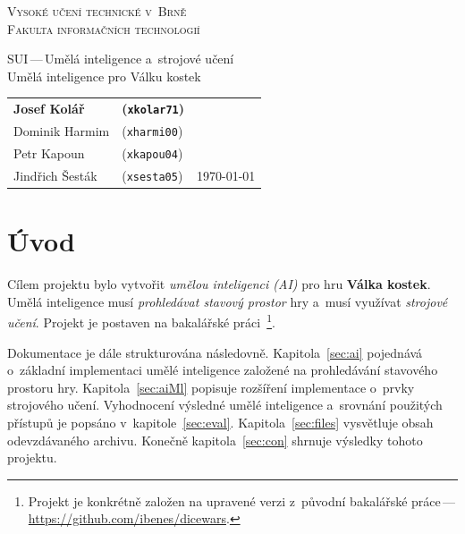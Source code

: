 \documentclass[11pt, a4paper]{article}
\theoremstyle{definition}
\begin{document}
\begin{titlepage}
    \begin{center}
        \LARGE{\textsc{Vysoké učení technické v~Brně}} \\
        \smallskip
        \Large{\textsc{Fakulta informačních technologií}} \\


        \LARGE{SUI\,---\,Umělá inteligence a~strojové učení} \\
        \smallskip
        \Huge{Umělá inteligence pro Válku kostek} \\

    \end{center}

    \Large{%
        \begin{tabular}{l l r}
            \textbf{Josef Kolář} & \textbf{(\texttt{xkolar71})} & \\
            Dominik Harmim & (\texttt{xharmi00}) & \\
            Petr Kapoun & (\texttt{xkapou04}) & \\
            Jindřich Šesták & (\texttt{xsesta05}) & \hspace{9em} \today
        \end{tabular}
    }
\end{titlepage}


\setcounter{page}{1}
\tableofcontents
\clearpage


\setcounter{page}{1}

\section{Úvod}

Cílem projektu bylo vytvořit \emph{umělou inteligenci (AI)} pro hru
\textbf{Válka kostek}. Umělá inteligence musí \emph{prohledávat stavový
prostor} hry a~musí využívat \emph{strojové učení}. Projekt je postaven
na bakalářské práci~\cite{turecekBP}\footnote{Projekt je konkrétně
založen na upravené verzi z~původní bakalářské
práce\,---\,\url{https://github.com/ibenes/dicewars}.}.

Dokumentace je dále strukturována následovně. Kapitola~\ref{sec:ai}
pojednává o~základní implementaci umělé inteligence založené na prohledávání
stavového prostoru hry. Kapitola~\ref{sec:aiMl} popisuje rozšíření
implementace o~prvky strojového učení. Vyhodnocení výsledné umělé
inteligence a~srovnání použitých přístupů je popsáno v~kapitole~\ref{sec:eval}.
Kapitola~\ref{sec:files} vysvětluje obsah odevzdávaného archivu. Konečně
kapitola~\ref{sec:con} shrnuje výsledky tohoto projektu.
\end{document}

